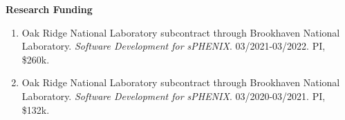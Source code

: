 \documentclass[11pt]{article}
\begin{document}
\vspace{7pt}

\begin{flushleft}
	\LARGE\textbf{Research Funding}
	\vspace{4pt}
	\normalsize
	\begin{center}
		\begin{enumerate}
			\item Oak Ridge National Laboratory subcontract through Brookhaven National Laboratory. \textit{Software Development for sPHENIX}. 03/2021-03/2022. PI, \$260k.
			\item Oak Ridge National Laboratory subcontract through Brookhaven National Laboratory. \textit{Software Development for sPHENIX}. 03/2020-03/2021. PI, \$132k.
		\end{enumerate}
	\end{center}
\end{flushleft}


\vspace{7pt}
\end{document}
